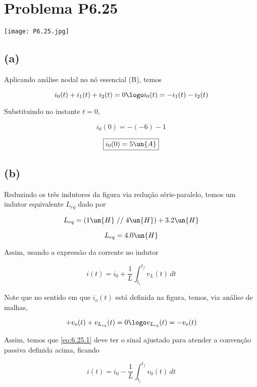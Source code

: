 
\section*{Problema P6.25}

\renewcommand*\thesection{6.25}

\begin{center}
    \texttt{[image: P6.25.jpg]}
\end{center}

\subsection*{(a)}

Aplicando análise nodal no nó essencial (B), temos

\[ i_0(t) + i_1(t) + i_2(t) = 0 \logo i_0(t) = - i_1(t) - i_2(t)  \]

Substituindo no instante $t=0$,

\[ i_0(0) = -(-6) - 1   \]

\[ \boxed{i_0(0) = 5 \un{A}}  \]

\subsection*{(b)}

Reduzindo os três indutores da figura via redução série-paralelo, temos um indutor equivalente $L_{eq}$ dado por 

\[ L_{eq} = (1\un{H} \;//\; 4\un{H}) + 3.2\un{H}  \]

\[ L_{eq} = 4.0\un{H}  \]

Assim, usando a expressão da corrente no indutor

\begin{equation}\label{eq:6.25.1}
    i(t) = i_0 + \frac{1}{L} \int_{t_i}^{t_f} v_L(t) \,dt
\end{equation}

Note que no sentido em que $i_o(t)$ está definida na figura, temos, via análise de malhas,

\[+v_o(t) + v_{L_{eq}}(t) = 0  \logo  v_{L_{eq}}(t) = - v_o(t) \]

Assim, temos que \eqref{eq:6.25.1} deve ter o sinal ajustado para atender a convenção passiva definida acima, ficando

\begin{equation}\label{eq:6.25.2}
    i(t) = i_0 - \frac{1}{L} \int_{t_i}^{t_f} v_0(t) \,dt
\end{equation}

